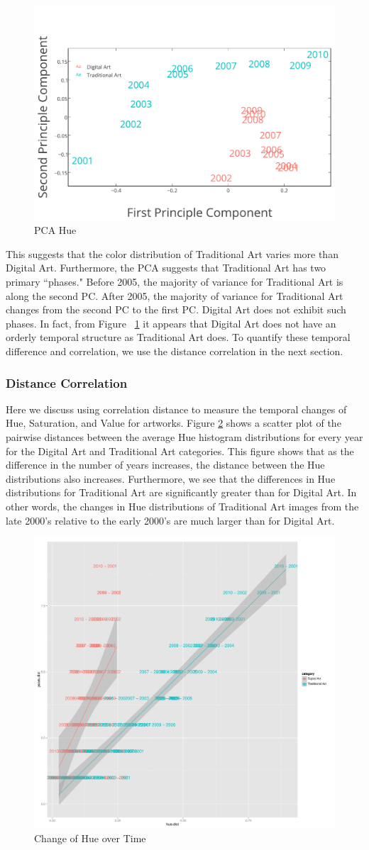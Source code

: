 \documentclass[letterpaper]{article}
\begin{document}
\begin{figure}
    \includegraphics[width = .4\textwidth]{pca_hue}
  \caption{PCA Hue}
  \label{fig:Hpca}
\end{figure}


This suggests that the color distribution of Traditional Art varies more than Digital Art. Furthermore, the PCA suggests that Traditional Art has two primary ``phases." Before 2005, the majority of variance for Traditional Art is along the second PC. After 2005, the majority of variance for Traditional Art changes from the second PC to the first PC.  Digital Art does not exhibit such phases. In fact, from Figure ~\ref{fig:Hpca} it appears that Digital Art does not have an orderly temporal structure as Traditional Art does. To quantify  these temporal difference and correlation, we use the distance correlation in the next section.


\subsubsection{Distance Correlation} Here we discuss using correlation distance to measure the temporal changes of Hue, Saturation, and Value for artworks. Figure \ref{fig:pair_diff} shows a scatter plot of the pairwise distances between the average Hue histogram distributions for every year for the Digital Art and Traditional Art categories. This figure shows that as the difference in the number of years increases, the distance between the Hue distributions also increases. Furthermore, we see that the differences in Hue distributions for Traditional Art are significantly greater than for Digital Art. In other words, the changes in Hue distributions of Traditional Art images from the late 2000's relative to the early 2000's are much larger than for Digital Art. 


\begin{figure}
    \includegraphics[width = .4\textwidth]{Hue_time}
  \caption{Change of Hue over Time}
  \label{fig:pair_diff}
\end{figure}
\end{document}
